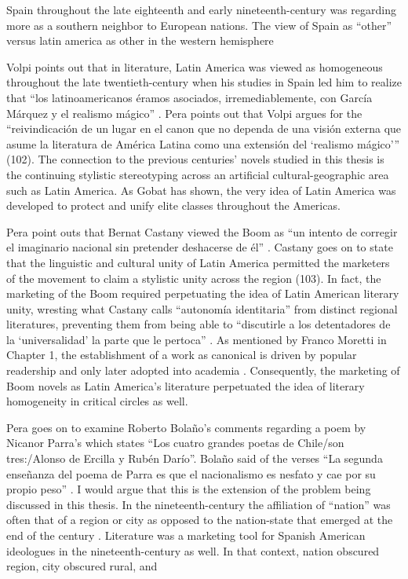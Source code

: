 \documentclass[12pt]{report}
\begin{document}
Spain throughout the late eighteenth and early nineteenth-century was regarding more as a southern neighbor to European nations.
The view of Spain as \enquote{other} versus latin america as other in the western hemisphere

Volpi points out that in literature, Latin America was viewed as homogeneous throughout the late twentieth-century when his studies in Spain led him to realize that \enquote{los latinoamericanos éramos asociados, irremediablemente, con García Márquez y el realismo mágico} \autocite*[102]{Pera2012}.
Pera points out that Volpi argues for the \enquote{reivindicación de un lugar en el canon que no dependa de una visión externa que asume la literatura de América Latina como una extensión del \enquote{realismo mágico}} (102).
The connection to the previous centuries' novels studied in this thesis is the continuing stylistic stereotyping across an artificial cultural-geographic area such as Latin America. 
As Gobat has shown, the very idea of Latin America was developed to protect and unify elite classes throughout the Americas.



Pera point outs that Bernat Castany viewed the Boom as \enquote{un intento de corregir el imaginario nacional sin pretender deshacerse de él} \autocite[Castany in][103]{Pera2012}.
Castany goes on to state that the linguistic and cultural unity of Latin America permitted the marketers of the movement to claim a stylistic unity across the region (103).
In fact, the marketing of the Boom required perpetuating the idea of Latin American literary unity, wresting what Castany calls \enquote{autonomía identitaria} from distinct regional literatures, preventing them from being able to \enquote{discutirle a los detentadores de la \enquote{universalidad} la parte que le pertoca} \autocite[Castany in][103]{Pera2012}.
As mentioned by Franco Moretti in Chapter 1, the establishment of a work as canonical is driven by popular readership and only later adopted into academia \cite[]{Moretti2013}.
Consequently, the marketing of Boom novels as Latin America's literature perpetuated the idea of literary homogeneity in critical circles as well.

Pera goes on to examine Roberto Bolaño's comments regarding a poem by Nicanor Parra's which states \enquote{Los cuatro grandes poetas de Chile/son tres:/Alonso de Ercilla y Rubén Darío}.
Bolaño said of the verses \enquote{La segunda enseñanza del poema de Parra es que el nacionalismo es nesfato y cae por su propio peso} \autocite[108]{Pera2012}.
I would argue that this is the extension of the problem being discussed in this thesis.
In the nineteenth-century the affiliation of \enquote{nation} was often that of a region or city as opposed to the nation-state that emerged at the end of the century \autocite{Chiaramonte2004}.
Literature was a marketing tool for Spanish American ideologues in the nineteenth-century as well. 
In that context, nation obscured region, city obscured rural, and 
\end{document}
